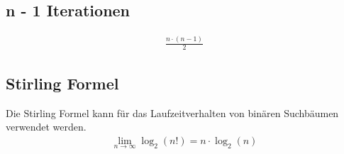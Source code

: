 \subsection{n - 1 Iterationen}
\begin{align}
	\frac{n \cdot (n - 1)}{2}
\end{align}

\subsection{Stirling Formel}
\label{eq:stirling}
Die Stirling Formel kann für das Laufzeitverhalten von binären Suchbäumen verwendet werden.
\begin{align}
	\lim\limits_{n \rightarrow \infty} \log_2(n!) = n\cdot \log_2(n)
\end{align}

